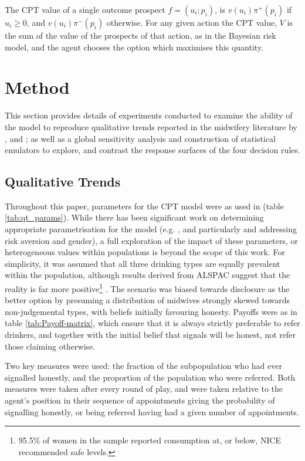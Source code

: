 \documentclass[graybox]{svmult}
\begin{document}
The \ac{CPT} value of a single outcome prospect \(f=(u_{i};p_{i})\), is $v(u_{i})\pi^{+}(p_{i})$
if $u_{i}\geq0$, and $v(u_{i})\pi^{-}(p_{i})$ otherwise. For any given action the \ac{CPT}
value, \(V\) is the sum of the value of the prospects of that action, as
in the Bayesian risk model, and the agent chooses the option which maximises this quantity. 
\section{Method}
\label{sec:method}

This section provides details of experiments conducted to examine the ability of the model to reproduce qualitative trends reported in the midwifery literature by \citet{Alvik2006}, and \citet{Phillips2007}; as well as a global sensitivity analysis and construction of statistical emulators to explore, and contrast the response surfaces of the four decision rules.

\subsection{Qualitative Trends}
\label{sub:qt}

Throughout this paper, parameters for the \ac{CPT} model were as used in \cite{Tversky1992} (table \ref{tab:qt_params}). While there has been significant work on determining appropriate parametrisation for the model (e.g. \cite{Neilson2002,Nilsson2011,Glockner2012}, and particularly \citet{Byrnes1999} and \citet{Booij2009} addressing risk aversion and gender), a full exploration of the impact of these parameters, or heterogeneous values within populations is beyond the scope of this work. For simplicity, it was assumed that all three drinking types are equally prevalent within the population, although results derived from \acl{ALSPAC} suggest that the reality is far more positive\footnote{95.5\% of women in the sample reported consumption at, or below, \ac{NICE} recommended safe levels.} \citep{Humphriss2013}. The scenario was biased towards disclosure as the better option by presuming a distribution of midwives strongly skewed towards non-judgemental types, with beliefs initially favouring honesty. Payoffs were as in table \ref{tab:Payoff-matrix}, which ensure that it is always strictly preferable to refer drinkers, and together with the initial belief that signals will be honest, not refer those claiming otherwise.

Two key measures were used: the fraction of the subpopulation who had ever signalled honestly, and the proportion of the population who were referred. Both measures were taken after every round of play, and were taken relative to the agent's position in their sequence of appointments giving the probability of signalling honestly, or being referred having had a given number of appointments.
\end{document}
